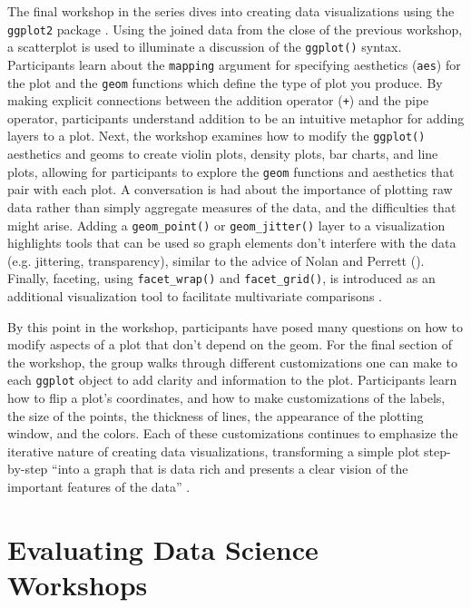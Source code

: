 \documentclass[12pt]{article}
\begin{document}
\noindent The final workshop in the series dives into creating data visualizations
using the \texttt{ggplot2} package \citep{ggplot}. Using the joined data from
the close of the previous workshop, a scatterplot is used to
illuminate a discussion of the \texttt{ggplot()} syntax. Participants learn
about the \texttt{mapping} argument
for specifying aesthetics (\texttt{aes}) for the plot and the \texttt{geom}
functions which define the type of plot you produce. By making
explicit connections between the addition operator (\texttt{+}) and the pipe
operator, participants understand addition to be an intuitive metaphor for
adding layers to a plot. Next, the workshop examines how to modify the
\texttt{ggplot()} aesthetics and geoms to create violin plots, density plots, 
bar charts, and line plots, allowing for participants to explore the 
\texttt{geom} functions and aesthetics that pair with each plot. A conversation
is had about the importance of plotting raw data rather than simply aggregate
measures of the data, and the difficulties that might arise. Adding a
\texttt{geom\_point()} or \texttt{geom\_jitter()} layer to a visualization
highlights tools that can be used so graph elements don't interfere with the
data (e.g. jittering, transparency), similar to the advice of Nolan and Perrett
(\citeyear{nolan-viz}). Finally, faceting, using \texttt{facet\_wrap()} and
\texttt{facet\_grid()}, is introduced as an additional visualization tool to
facilitate multivariate comparisons \citep[p.\ 261]{nolan-viz}. 

\quad By this point in the workshop, participants have posed many questions on
how to modify aspects of a plot that don't depend on the geom. For the final 
section of the workshop, the group walks through different customizations one 
can make to each \texttt{ggplot} object to add clarity and information to the 
plot. Participants learn how to flip a plot's coordinates, and how to make
customizations of the labels, the size of the points, the thickness of
lines, the appearance of the plotting window, and the colors. Each of
these customizations continues to emphasize the iterative nature 
of creating data visualizations, transforming a simple plot step-by-step ``into
a graph that is data rich and presents a clear vision of the important features
of the data'' \citep[p.\ 262]{nolan-viz}.

\section{Evaluating Data Science Workshops}
\label{sec:implement}
\end{document}
